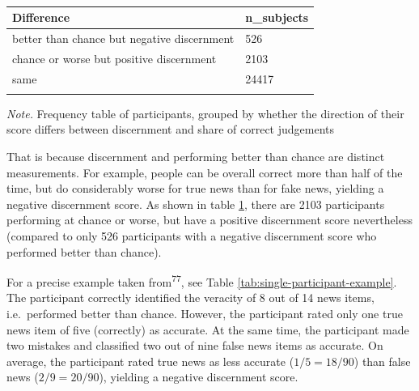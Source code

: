 \documentclass[
  man]{apa6}
\begin{document}
\begin{table}[tbp]

\begin{center}
\begin{threeparttable}

\caption{\label{tab:compare-individual-measures}}

\begin{tabular}{ll}
\toprule
Difference & \multicolumn{1}{c}{n\_subjects}\\
\midrule
better than chance but negative discernment & 526\\
chance or worse but positive discernment & 2103\\
same & 24417\\
\bottomrule
\addlinespace
\end{tabular}

\begin{tablenotes}[para]
\normalsize{\textit{Note.} Frequency table of participants, grouped by whether the direction of their score differs between discernment and share of correct judgements}
\end{tablenotes}

\end{threeparttable}
\end{center}

\end{table}

That is because discernment and performing better than chance are distinct measurements. For example, people can be overall correct more than half of the time, but do considerably worse for true news than for fake news, yielding a negative discernment score. As shown in table \ref{tab:compare-individual-measures}, there are 2103 participants performing at chance or worse, but have a positive discernment score nevertheless (compared to only 526 participants with a negative discernment score who performed better than chance).

For a precise example taken from\textsuperscript{77}, see Table \ref{tab:single-participant-example}. The participant correctly identified the veracity of 8 out of 14 news items, i.e.~performed better than chance. However, the participant rated only one true news item of five (correctly) as accurate. At the same time, the participant made two mistakes and classified two out of nine false news items as accurate. On average, the participant rated true news as less accurate (\(1/5 = 18/90\)) than false news (\(2/9 = 20/90\)), yielding a negative discernment score.
\end{document}
